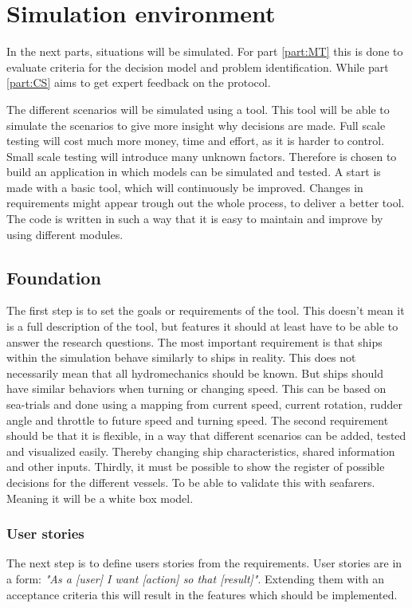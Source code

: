 \chapter{Simulation environment}
\label{app:tool}
In the next parts, situations will be simulated. For part \ref{part:MT} this is done to evaluate criteria for the decision model and problem identification. While part \ref{part:CS} aims to get expert feedback on the protocol.

The different scenarios will be simulated using a tool. This tool will be able to simulate the scenarios to give more insight why decisions are made. Full scale testing will cost much more money, time and effort, as it is harder to control. Small scale testing will introduce many unknown factors. Therefore is chosen to build an application in which models can be simulated and tested.
A start is made with a basic tool, which will continuously be improved. Changes in requirements might appear trough out the whole process, to deliver a better tool. The code is written in such a way that it is easy to maintain and improve by using different modules.

\section{Foundation}
The first step is to set the goals or requirements of the tool. This doesn't mean it is a full description of the tool, but features it should at least have to be able to answer the research questions.
The most important requirement is that ships within the simulation behave similarly to ships in reality. This does not necessarily mean that all hydromechanics should be known. But ships should have similar behaviors when turning or changing speed. This can be based on sea-trials and done using a mapping from current speed, current rotation, rudder angle and throttle to future speed and turning speed.
The second requirement should be that it is flexible, in a way that different scenarios can be added, tested and visualized easily. Thereby changing ship characteristics, shared information and other inputs.
Thirdly, it must be possible to show the register of possible decisions for the different vessels. To be able to validate this with seafarers. Meaning it will be a white box model.

\subsection{User stories}
The next step is to define users stories from the requirements. User stories are in a form: \emph{"As a [user] I want [action] so that [result]"}. Extending them with an acceptance criteria this will result in the features which should be implemented.

